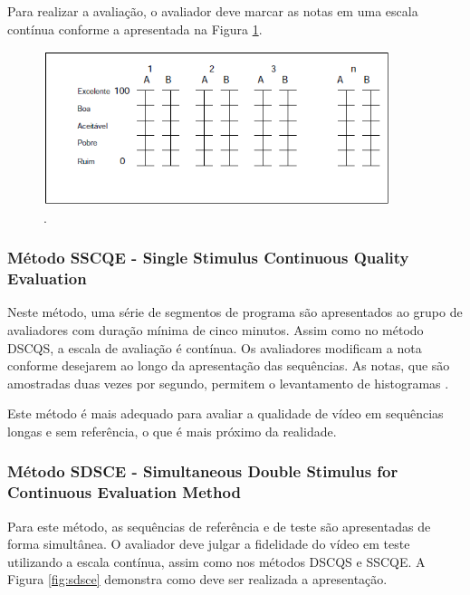 Para realizar a avaliação, o avaliador deve marcar as notas em uma escala contínua conforme a apresentada na Figura \ref{fig:dscqsescala}.

\begin{figure}[!htb]
	\centering
	\includegraphics[width=0.9\textwidth]{./imgs/dscqsescala.png}
	\caption{.}
	\label{fig:dscqsescala}
\end{figure}

\subsubsection{Método SSCQE - Single Stimulus Continuous Quality Evaluation}

Neste método, uma série de segmentos de programa são apresentados ao grupo de avaliadores com duração mínima de cinco minutos. Assim como no método DSCQS, a escala de avaliação é contínua. Os avaliadores modificam a nota conforme desejarem ao longo da apresentação das sequências. As notas, que são amostradas duas vezes por segundo, permitem o levantamento de histogramas \cite{rehme}.

Este método é mais adequado para avaliar a qualidade de vídeo em sequências longas e sem referência, o que é mais próximo da realidade.

\subsubsection{Método SDSCE - Simultaneous Double Stimulus for Continuous Evaluation Method}

Para este método, as sequências de referência e de teste são apresentadas de forma simultânea. O avaliador deve julgar a fidelidade do vídeo em teste utilizando a escala contínua, assim como nos métodos DSCQS e SSCQE. A Figura \ref{fig:sdsce} demonstra como deve ser realizada a apresentação.

